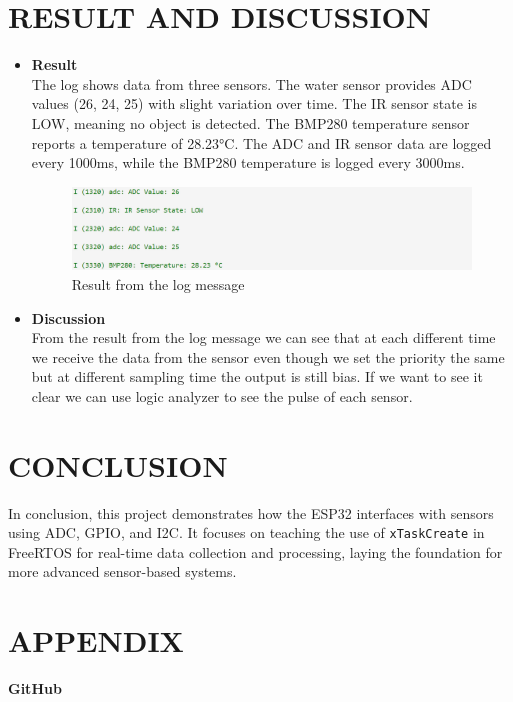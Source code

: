 \section{RESULT AND DISCUSSION}
         \begin{itemize}[label=$\blacksquare$]
             \item \textbf{Result}\\
             The log shows data from three sensors. The water sensor provides ADC values (26, 24, 25) with slight variation over time. The IR sensor state is LOW, meaning no object is detected. The BMP280 temperature sensor reports a temperature of 28.23°C. The ADC and IR sensor data are logged every 1000ms, while the BMP280 temperature is logged every 3000ms.
             \begin{figure}[H]
                 \centering
                 \includegraphics[width=0.8\linewidth]{result.png}
                 \caption{Result from the log message}
                 \label{fig:enter-label}
             \end{figure}
             \item \textbf{Discussion}\\
             From the result from the log message we can see that at each different time we receive the data from the sensor even though we set the priority the same but at different sampling time the output is still bias. If we want to see it clear we can use logic analyzer to see the pulse of each sensor.
         \end{itemize}
\section{CONCLUSION}
         In conclusion, this project demonstrates how the ESP32 interfaces with sensors using ADC, GPIO, and I2C. It focuses on teaching the use of \texttt{xTaskCreate} in FreeRTOS for real-time data collection and processing, laying the foundation for more advanced sensor-based systems.
\section{APPENDIX}
\textbf{GitHub}